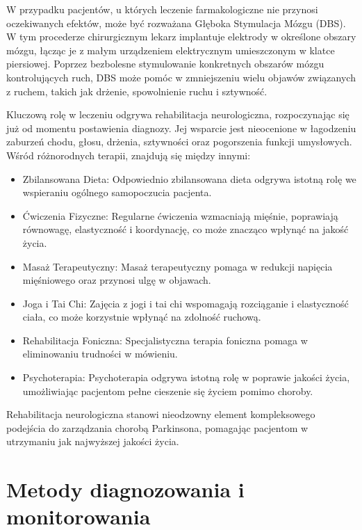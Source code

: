 W przypadku pacjentów, u których leczenie farmakologiczne nie przynosi oczekiwanych efektów, może być rozważana Głęboka Stymulacja Mózgu (DBS).
W tym procederze chirurgicznym lekarz implantuje elektrody w określone obszary mózgu, łącząc je z małym urządzeniem elektrycznym umieszczonym w klatce piersiowej.
Poprzez bezbolesne stymulowanie konkretnych obszarów mózgu kontrolujących ruch, DBS może pomóc w zmniejszeniu wielu objawów związanych z ruchem,
takich jak drżenie, spowolnienie ruchu i sztywność.

Kluczową rolę w leczeniu odgrywa rehabilitacja neurologiczna, rozpoczynając się już od momentu postawienia diagnozy.
Jej wsparcie jest nieocenione w łagodzeniu zaburzeń chodu, głosu, drżenia, sztywności oraz pogorszenia funkcji umysłowych.
Wśród różnorodnych terapii, znajdują się między innymi:
\begin{itemize}[itemsep=0.1pt]
	\item Zbilansowana Dieta: Odpowiednio zbilansowana dieta odgrywa istotną rolę we wspieraniu ogólnego samopoczucia pacjenta.
	\item Ćwiczenia Fizyczne: Regularne ćwiczenia wzmacniają mięśnie, poprawiają równowagę, elastyczność i koordynację, co może znacząco wpłynąć na jakość życia.
	\item Masaż Terapeutyczny: Masaż terapeutyczny pomaga w redukcji napięcia mięśniowego oraz przynosi ulgę w objawach.
	\item Joga i Tai Chi: Zajęcia z jogi i tai chi wspomagają rozciąganie i elastyczność ciała, co może korzystnie wpłynąć na zdolność ruchową.
	\item Rehabilitacja Foniczna: Specjalistyczna terapia foniczna pomaga w eliminowaniu trudności w mówieniu.
	\item Psychoterapia: Psychoterapia odgrywa istotną rolę w poprawie jakości życia, umożliwiając pacjentom pełne cieszenie się życiem pomimo choroby.
\end{itemize}

Rehabilitacja neurologiczna stanowi nieodzowny element kompleksowego podejścia do zarządzania chorobą Parkinsona, pomagając pacjentom w utrzymaniu jak najwyższej jakości życia.


\section{Metody diagnozowania i monitorowania}
\label{subsec:diagnostyka}

